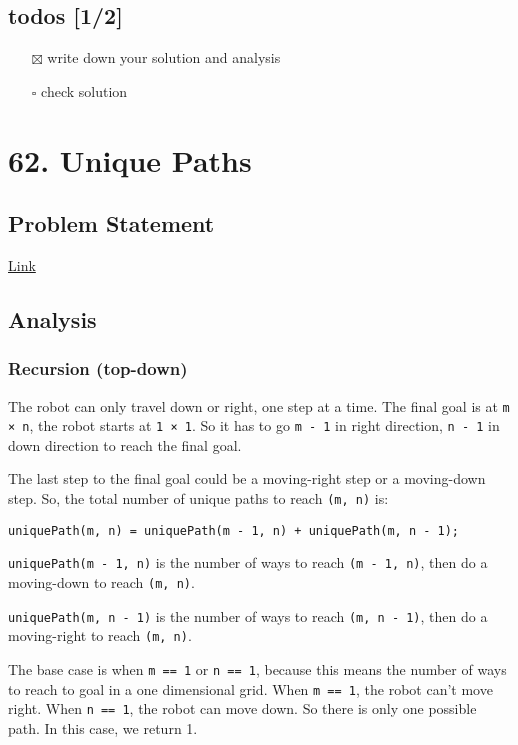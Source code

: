 \documentclass[12pt]{article}
\begin{document}
\subsection{todos [1/2]}
\label{sec:orge0bfddc}
\begin{itemize}
\item[{$\boxtimes$}] write down your solution and analysis
\item[{$\square$}] check solution
\end{itemize}
\section{62. Unique Paths}
\label{sec:org8f863ba}
\subsection{Problem Statement}
\label{sec:org6a44596}
\href{https://leetcode.com/problems/unique-paths/}{Link}
\subsection{Analysis}
\label{sec:org4d62230}
\subsubsection{Recursion (top-down)}
\label{sec:org559c1c6}
The robot can only travel down or right, one step at a time. The final goal is at \texttt{m × n}, the robot starts at \texttt{1 × 1}. So it has to go \texttt{m - 1} in right direction, \texttt{n - 1} in down direction to reach the final goal.

The last step to the final goal could be a moving-right step or a moving-down step. So, the total number of unique paths to reach \texttt{(m, n)} is:
\begin{verbatim}
uniquePath(m, n) = uniquePath(m - 1, n) + uniquePath(m, n - 1);
\end{verbatim}

\texttt{uniquePath(m - 1, n)} is the number of ways to reach \texttt{(m - 1, n)}, then do a moving-down to reach \texttt{(m, n)}.

\texttt{uniquePath(m, n - 1)} is the number of ways to reach \texttt{(m, n - 1)}, then do a moving-right to reach \texttt{(m, n)}.

The base case is when \texttt{m == 1} or \texttt{n == 1}, because this means the number of ways to reach to goal in a one dimensional grid. When \texttt{m == 1}, the robot can't move right. When \texttt{n == 1}, the robot can move down. So there is only one possible path. In this case, we return 1.
\end{document}
